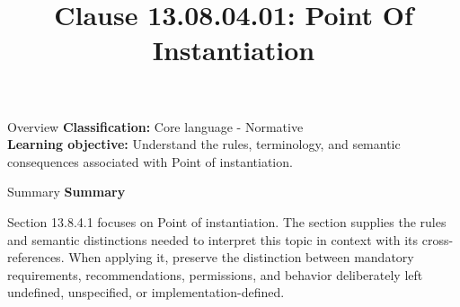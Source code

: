 \documentclass[10pt,letterpaper]{article}
\title{Clause 13.08.04.01: Point Of Instantiation}
\author{}
\date{}
\begin{document}
\maketitle
\begin{CornellOverviewBox}{Overview}
\textbf{Classification:} Core language - Normative\\[2pt]
\textbf{Learning objective:} Understand the rules, terminology, and semantic consequences associated with Point of instantiation.
\end{CornellOverviewBox}\begin{CornellSummaryBox}{Summary}
{\sffamily\bfseries\color{Accent} Summary}\par\vspace{3pt}Section 13.8.4.1 focuses on Point of instantiation. The section supplies the rules and semantic distinctions needed to interpret this topic in context with its cross-references. When applying it, preserve the distinction between mandatory requirements, recommendations, permissions, and behavior deliberately left undefined, unspecified, or implementation-defined.
\end{CornellSummaryBox}
\end{document}
